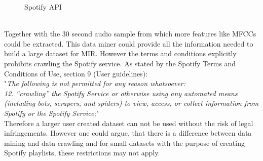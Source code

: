\begin{figure}[htbp]
	\centering
	\caption{Spotify API}
	\label{fig:spotify}
\end{figure}
\FloatBarrier
\ \\
Together with the 30 second audio sample from which more features like MFCCs could be extracted. This data miner could provide all the information needed to build a large dataset for MIR. However the terms and conditions explicitly prohibits crawling the Spotify service. As stated by the Spotify Terms and Conditions of Use, section 9 (User guidelines):\\
"\textit{The following is not permitted for any reason whatsoever:\newline
[...]\\
12. “crawling” the Spotify Service or otherwise using any automated means (including bots, scrapers, and spiders) to view, access, or collect information from Spotify or the Spotify Service;}" \cite{spottac1}\\
Therefore a larger user created dataset can not be used without the risk of legal infringements. However one could argue, that there is a difference between data mining and data crawling and for small datasets with the purpose of creating Spotify playlists, these restrictions may not apply.\\ 
